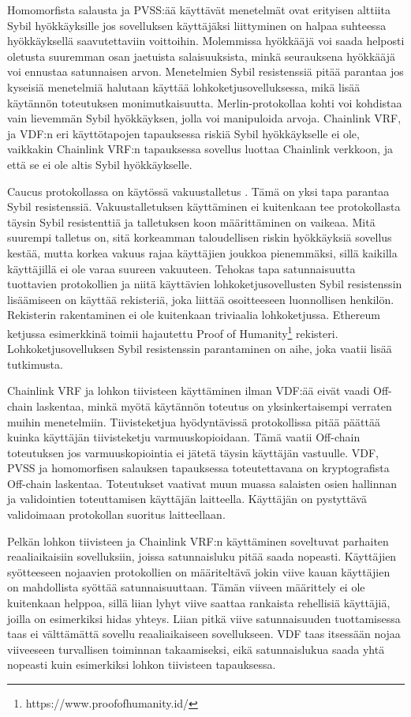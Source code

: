 Homomorfista salausta ja PVSS:ää käyttävät menetelmät ovat erityisen alttiita Sybil hyökkäyksille jos sovelluksen käyttäjäksi liittyminen on halpaa suhteessa hyökkäyksellä saavutettaviin voittoihin. Molemmissa hyökkääjä voi saada helposti oletusta suuremman osan jaetuista salaisuuksista, minkä seurauksena hyökkääjä voi ennustaa satunnaisen arvon. Menetelmien Sybil resistenssiä pitää parantaa jos kyseisiä menetelmiä halutaan käyttää lohkoketjusovelluksessa, mikä lisää käytännön toteutuksen monimutkaisuutta. Merlin-protokollaa kohti voi kohdistaa vain lievemmän Sybil hyökkäyksen, jolla voi manipuloida arvoja. Chainlink VRF, ja VDF:n eri käyttötapojen tapauksessa riskiä Sybil hyökkäykselle ei ole, vaikkakin Chainlink VRF:n tapauksessa sovellus luottaa Chainlink verkkoon, ja että se ei ole altis Sybil hyökkäykselle.

Caucus protokollassa on käytössä vakuustalletus \cite{Caucus}. Tämä on yksi tapa parantaa Sybil resistenssiä. Vakuustalletuksen käyttäminen ei kuitenkaan tee protokollasta täysin Sybil resistenttiä ja talletuksen koon määrittäminen on vaikeaa. Mitä suurempi talletus on, sitä korkeamman taloudellisen riskin hyökkäyksiä sovellus kestää, mutta korkea vakuus rajaa käyttäjien joukkoa pienemmäksi, sillä kaikilla käyttäjillä ei ole varaa suureen vakuuteen. Tehokas tapa satunnaisuutta tuottavien protokollien ja niitä käyttävien lohkoketjusovellusten Sybil resistenssin lisäämiseen on käyttää rekisteriä, joka liittää osoitteeseen luonnollisen henkilön. Rekisterin rakentaminen ei ole kuitenkaan triviaalia lohkoketjussa. Ethereum ketjussa esimerkkinä toimii hajautettu Proof of Humanity\footnote{https://www.proofofhumanity.id/} rekisteri. Lohkoketjusovelluksen Sybil resistenssin parantaminen on aihe, joka vaatii lisää tutkimusta.

Chainlink VRF ja lohkon tiivisteen käyttäminen ilman VDF:ää eivät vaadi Off-chain laskentaa, minkä myötä käytännön toteutus on yksinkertaisempi verraten muihin menetelmiin. Tiivisteketjua hyödyntävissä protokollissa pitää päättää kuinka käyttäjän tiivisteketju varmuuskopioidaan. Tämä vaatii Off-chain toteutuksen jos varmuuskopiointia ei jätetä täysin käyttäjän vastuulle. VDF, PVSS ja homomorfisen salauksen tapauksessa toteutettavana on kryptografista Off-chain laskentaa. Toteutukset vaativat muun muassa salaisten osien hallinnan ja validointien toteuttamisen käyttäjän laitteella. Käyttäjän on pystyttävä validoimaan protokollan suoritus laitteellaan.

Pelkän lohkon tiivisteen ja Chainlink VRF:n käyttäminen soveltuvat parhaiten reaaliaikaisiin sovelluksiin, joissa satunnaisluku pitää saada nopeasti. Käyttäjien syötteeseen nojaavien protokollien on määriteltävä jokin viive kauan käyttäjien on mahdollista syöttää satunnaisuuttaan. Tämän viiveen määrittely ei ole kuitenkaan helppoa, sillä liian lyhyt viive saattaa rankaista rehellisiä käyttäjiä, joilla on esimerkiksi hidas yhteys. Liian pitkä viive satunnaisuuden tuottamisessa taas ei välttämättä sovellu reaaliaikaiseen sovellukseen. VDF taas itsessään nojaa viiveeseen turvallisen toiminnan takaamiseksi, eikä satunnaislukua saada yhtä nopeasti kuin esimerkiksi lohkon tiivisteen tapauksessa.


